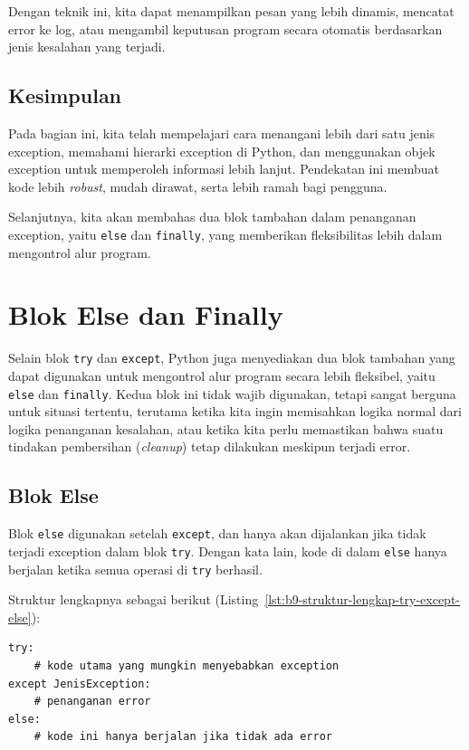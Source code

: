 Dengan teknik ini, kita dapat menampilkan pesan yang lebih dinamis, mencatat error ke log, atau mengambil keputusan program secara otomatis berdasarkan jenis kesalahan yang terjadi.

\subsection*{Kesimpulan}

Pada bagian ini, kita telah mempelajari cara menangani lebih dari satu jenis exception, memahami hierarki exception di Python, dan menggunakan objek exception untuk memperoleh informasi lebih lanjut.  
Pendekatan ini membuat kode lebih \textit{robust}, mudah dirawat, serta lebih ramah bagi pengguna.  

Selanjutnya, kita akan membahas dua blok tambahan dalam penanganan exception, yaitu \texttt{else} dan \texttt{finally}, yang memberikan fleksibilitas lebih dalam mengontrol alur program.


\section{Blok Else dan Finally}

Selain blok \texttt{try} dan \texttt{except}, Python juga menyediakan dua blok tambahan yang dapat digunakan untuk mengontrol alur program secara lebih fleksibel, yaitu \texttt{else} dan \texttt{finally}. Kedua blok ini tidak wajib digunakan, tetapi sangat berguna untuk situasi tertentu, terutama ketika kita ingin memisahkan logika normal dari logika penanganan kesalahan, atau ketika kita perlu memastikan bahwa suatu tindakan pembersihan (\textit{cleanup}) tetap dilakukan meskipun terjadi error.

\subsection*{Blok Else}

Blok \texttt{else} digunakan setelah \texttt{except}, dan hanya akan dijalankan jika tidak terjadi exception dalam blok \texttt{try}. Dengan kata lain, kode di dalam \texttt{else} hanya berjalan ketika semua operasi di \texttt{try} berhasil.

Struktur lengkapnya sebagai berikut (Listing~\ref{lst:b9-struktur-lengkap-try-except-else}):

\begin{lstlisting}[style=PythonStyle, caption={Struktur lengkap try-except-else}, label={lst:b9-struktur-lengkap-try-except-else}]
try:
    # kode utama yang mungkin menyebabkan exception
except JenisException:
    # penanganan error
else:
    # kode ini hanya berjalan jika tidak ada error
\end{lstlisting}

